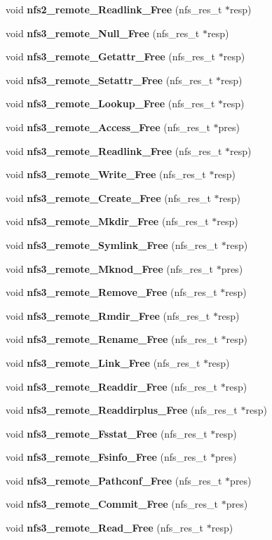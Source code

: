 \begin{CompactItemize}
\item 
void {\bf nfs2\_\-remote\_\-Readlink\_\-Free} (nfs\_\-res\_\-t $\ast$resp)
\item 
void {\bf nfs3\_\-remote\_\-Null\_\-Free} (nfs\_\-res\_\-t $\ast$resp)
\item 
void {\bf nfs3\_\-remote\_\-Getattr\_\-Free} (nfs\_\-res\_\-t $\ast$resp)
\item 
void {\bf nfs3\_\-remote\_\-Setattr\_\-Free} (nfs\_\-res\_\-t $\ast$resp)
\item 
void {\bf nfs3\_\-remote\_\-Lookup\_\-Free} (nfs\_\-res\_\-t $\ast$resp)
\item 
void {\bf nfs3\_\-remote\_\-Access\_\-Free} (nfs\_\-res\_\-t $\ast$pres)
\item 
void {\bf nfs3\_\-remote\_\-Readlink\_\-Free} (nfs\_\-res\_\-t $\ast$resp)
\item 
void {\bf nfs3\_\-remote\_\-Write\_\-Free} (nfs\_\-res\_\-t $\ast$resp)
\item 
void {\bf nfs3\_\-remote\_\-Create\_\-Free} (nfs\_\-res\_\-t $\ast$resp)
\item 
void {\bf nfs3\_\-remote\_\-Mkdir\_\-Free} (nfs\_\-res\_\-t $\ast$resp)
\item 
void {\bf nfs3\_\-remote\_\-Symlink\_\-Free} (nfs\_\-res\_\-t $\ast$resp)
\item 
void {\bf nfs3\_\-remote\_\-Mknod\_\-Free} (nfs\_\-res\_\-t $\ast$pres)
\item 
void {\bf nfs3\_\-remote\_\-Remove\_\-Free} (nfs\_\-res\_\-t $\ast$resp)
\item 
void {\bf nfs3\_\-remote\_\-Rmdir\_\-Free} (nfs\_\-res\_\-t $\ast$resp)
\item 
void {\bf nfs3\_\-remote\_\-Rename\_\-Free} (nfs\_\-res\_\-t $\ast$resp)
\item 
void {\bf nfs3\_\-remote\_\-Link\_\-Free} (nfs\_\-res\_\-t $\ast$resp)
\item 
void {\bf nfs3\_\-remote\_\-Readdir\_\-Free} (nfs\_\-res\_\-t $\ast$resp)
\item 
void {\bf nfs3\_\-remote\_\-Readdirplus\_\-Free} (nfs\_\-res\_\-t $\ast$resp)
\item 
void {\bf nfs3\_\-remote\_\-Fsstat\_\-Free} (nfs\_\-res\_\-t $\ast$resp)
\item 
void {\bf nfs3\_\-remote\_\-Fsinfo\_\-Free} (nfs\_\-res\_\-t $\ast$pres)
\item 
void {\bf nfs3\_\-remote\_\-Pathconf\_\-Free} (nfs\_\-res\_\-t $\ast$pres)
\item 
void {\bf nfs3\_\-remote\_\-Commit\_\-Free} (nfs\_\-res\_\-t $\ast$pres)
\item 
void {\bf nfs3\_\-remote\_\-Read\_\-Free} (nfs\_\-res\_\-t $\ast$resp)
\end{CompactItemize}


